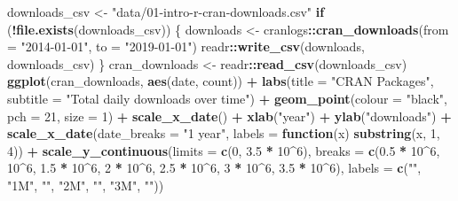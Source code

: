 \documentclass[
]{article}
\newenvironment{Shaded}{\begin{snugshade}}{\end{snugshade}}
\newcommand{\ControlFlowTok}[1]{\textcolor[rgb]{0.13,0.29,0.53}{\textbf{#1}}}
\newcommand{\DataTypeTok}[1]{\textcolor[rgb]{0.13,0.29,0.53}{#1}}
\newcommand{\DecValTok}[1]{\textcolor[rgb]{0.00,0.00,0.81}{#1}}
\newcommand{\FloatTok}[1]{\textcolor[rgb]{0.00,0.00,0.81}{#1}}
\newcommand{\KeywordTok}[1]{\textcolor[rgb]{0.13,0.29,0.53}{\textbf{#1}}}
\newcommand{\NormalTok}[1]{#1}
\newcommand{\OperatorTok}[1]{\textcolor[rgb]{0.81,0.36,0.00}{\textbf{#1}}}
\newcommand{\StringTok}[1]{\textcolor[rgb]{0.31,0.60,0.02}{#1}}
\begin{document}
\begin{Shaded}
\begin{Highlighting}[]
\NormalTok{downloads_csv <-}\StringTok{ "data/01-intro-r-cran-downloads.csv"}
\ControlFlowTok{if}\NormalTok{ (}\OperatorTok{!}\KeywordTok{file.exists}\NormalTok{(downloads_csv)) \{}
\NormalTok{    downloads <-}\StringTok{ }\NormalTok{cranlogs}\OperatorTok{::}\KeywordTok{cran_downloads}\NormalTok{(}\DataTypeTok{from =} \StringTok{"2014-01-01"}\NormalTok{, }\DataTypeTok{to =} \StringTok{"2019-01-01"}\NormalTok{)}
\NormalTok{    readr}\OperatorTok{::}\KeywordTok{write_csv}\NormalTok{(downloads, downloads_csv)}
\NormalTok{\}}
\NormalTok{cran_downloads <-}\StringTok{ }\NormalTok{readr}\OperatorTok{::}\KeywordTok{read_csv}\NormalTok{(downloads_csv)}
\KeywordTok{ggplot}\NormalTok{(cran_downloads, }\KeywordTok{aes}\NormalTok{(date, count)) }\OperatorTok{+}\StringTok{ }\KeywordTok{labs}\NormalTok{(}\DataTypeTok{title =} \StringTok{"CRAN Packages"}\NormalTok{, }\DataTypeTok{subtitle =} \StringTok{"Total daily downloads over time"}\NormalTok{) }\OperatorTok{+}\StringTok{ }
\StringTok{    }\KeywordTok{geom_point}\NormalTok{(}\DataTypeTok{colour =} \StringTok{"black"}\NormalTok{, }\DataTypeTok{pch =} \DecValTok{21}\NormalTok{, }\DataTypeTok{size =} \DecValTok{1}\NormalTok{) }\OperatorTok{+}\StringTok{ }\KeywordTok{scale_x_date}\NormalTok{() }\OperatorTok{+}\StringTok{ }\KeywordTok{xlab}\NormalTok{(}\StringTok{"year"}\NormalTok{) }\OperatorTok{+}\StringTok{ }
\StringTok{    }\KeywordTok{ylab}\NormalTok{(}\StringTok{"downloads"}\NormalTok{) }\OperatorTok{+}\StringTok{ }\KeywordTok{scale_x_date}\NormalTok{(}\DataTypeTok{date_breaks =} \StringTok{"1 year"}\NormalTok{, }\DataTypeTok{labels =} \ControlFlowTok{function}\NormalTok{(x) }\KeywordTok{substring}\NormalTok{(x, }
    \DecValTok{1}\NormalTok{, }\DecValTok{4}\NormalTok{)) }\OperatorTok{+}\StringTok{ }\KeywordTok{scale_y_continuous}\NormalTok{(}\DataTypeTok{limits =} \KeywordTok{c}\NormalTok{(}\DecValTok{0}\NormalTok{, }\FloatTok{3.5} \OperatorTok{*}\StringTok{ }\DecValTok{10}\OperatorTok{^}\DecValTok{6}\NormalTok{), }\DataTypeTok{breaks =} \KeywordTok{c}\NormalTok{(}\FloatTok{0.5} \OperatorTok{*}\StringTok{ }\DecValTok{10}\OperatorTok{^}\DecValTok{6}\NormalTok{, }
    \DecValTok{10}\OperatorTok{^}\DecValTok{6}\NormalTok{, }\FloatTok{1.5} \OperatorTok{*}\StringTok{ }\DecValTok{10}\OperatorTok{^}\DecValTok{6}\NormalTok{, }\DecValTok{2} \OperatorTok{*}\StringTok{ }\DecValTok{10}\OperatorTok{^}\DecValTok{6}\NormalTok{, }\FloatTok{2.5} \OperatorTok{*}\StringTok{ }\DecValTok{10}\OperatorTok{^}\DecValTok{6}\NormalTok{, }\DecValTok{3} \OperatorTok{*}\StringTok{ }\DecValTok{10}\OperatorTok{^}\DecValTok{6}\NormalTok{, }\FloatTok{3.5} \OperatorTok{*}\StringTok{ }\DecValTok{10}\OperatorTok{^}\DecValTok{6}\NormalTok{), }\DataTypeTok{labels =} \KeywordTok{c}\NormalTok{(}\StringTok{""}\NormalTok{, }
    \StringTok{"1M"}\NormalTok{, }\StringTok{""}\NormalTok{, }\StringTok{"2M"}\NormalTok{, }\StringTok{""}\NormalTok{, }\StringTok{"3M"}\NormalTok{, }\StringTok{""}\NormalTok{))}
\end{Highlighting}
\end{Shaded}
\end{document}
